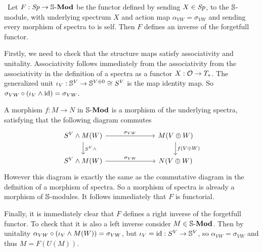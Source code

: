 \begin{exercise}[4]\ 
Let $F: \Sp \to \SMod$ be the functor defined by sending 
$X \in \Sp$, to the $\S$-module, with underlying spectrum $X$ and action map 
$\alpha_{VW} = \sigma_{VW}$ and sending every morphism of spectra to is self.
Then $F$ defines an inverse of the forgetfull functor. 

Firstly, we need to check that the structure maps satisfy associativity and
unitality. Associativity follows immediately from the associativity from the
associativity in the definition of a spectra as a functor $X: \O \to T_*$. 
The generalized unit $\iota_V : \S^V \to \S^{V \oplus 0} \cong S^V$ is the map
identity map. So $\sigma_{VW} \circ (\iota_V \smsh \id) = \sigma_{VW}$.

A morphism $f: M \to N$ in $\SMod$ is a morphism of the underlying spectra, satisfying that the following
diagram commutes
\[ \begin{tikzcd}[column sep = 7em]
S^V \smsh M(W) \ar[r, "\sigma_{VW}"] \ar[d, "S^V \smsh"] 
& M(V\oplus W) \ar[d, "f(V\oplus W)"] \\
S^V \smsh M(W) \ar[r, "\sigma_{VW}"] 
& N(V\oplus W)
\end{tikzcd} \] 
However this diagram is exactly the same as the commutative diagram in the
definition of a morphism of spectra. So a morphism of spectra is already a
morphism of $\S$-modules. It follows immediately that  $F$ is functorial. 

Finally, it is immediately clear that $F$ defines a right inverse of the
forgetfull functor. To check that it is also a left inverse consider $M \in
\SMod$. Then by unitality $\alpha_{VW} \circ (\iota_V \smsh M(W)) =
\sigma_{VW}$, but $\iota_V = \id : S^V \to \S^V$, so $\alpha_{VW} =
\sigma_{VW}$ and thus $M = F(U(M))$.
\end{exercise}


